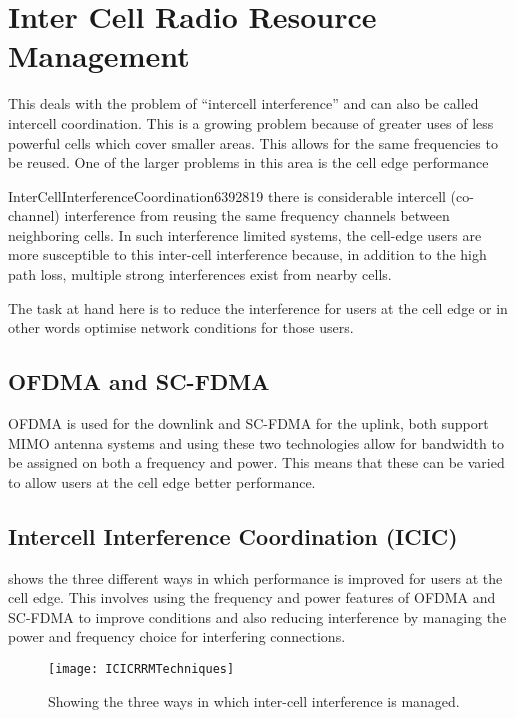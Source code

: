 \section{Inter Cell Radio Resource Management}
{
	This deals with the problem of \enquote{intercell interference}\cite{Choi2010} and can also be called intercell coordination. This is a growing problem because of greater uses of less powerful cells which cover smaller areas. This allows for the same frequencies to be reused. One of the larger problems in this area is the cell edge performance 
	\begin{displaycquote}{InterCellInterferenceCoordination6392819}
		there is considerable intercell (co-channel) interference from reusing the same frequency channels between neighboring cells. In such interference limited systems, the cell-edge users are more susceptible to this inter-cell interference because, in addition to the high path loss, multiple strong interferences exist from nearby cells.
	\end{displaycquote}
	The task at hand here is to reduce the interference for users at the cell edge or in other words optimise network conditions for those users.
	\subsection{OFDMA and SC-FDMA}
	{
		OFDMA is used for the downlink and SC-FDMA for the uplink, both support MIMO antenna systems and using these two technologies allow for bandwidth to be assigned on both a frequency and power. This means that these can be varied to allow users at the cell edge better performance.
	}
	\subsection{Intercell Interference Coordination (ICIC)}
	{
		 shows the three different ways in which performance is improved for users at the cell edge. This involves using the frequency and power features of OFDMA and SC-FDMA to improve conditions and also reducing interference by managing the power and frequency choice for interfering connections.
		\begin{figure}
			\centering
			\texttt{[image: ICICRRMTechniques]}
			\caption{Showing the three ways in which inter-cell interference is managed. \cite{InterCellInterferenceCoordination6392819}}
			\label{fig:ICICTechniques}
		\end{figure}
	}
}